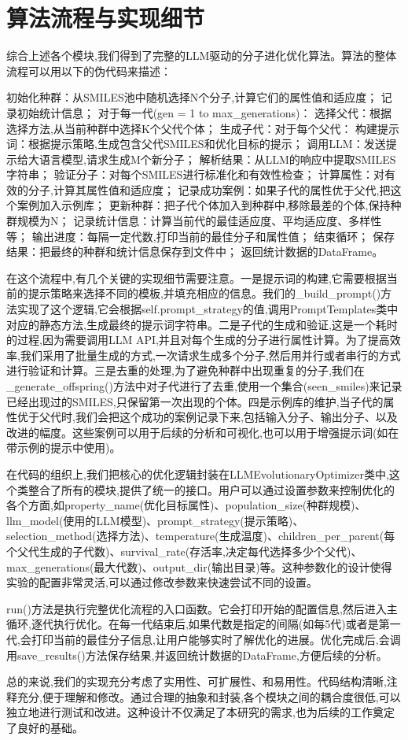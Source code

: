 \section{算法流程与实现细节}

综合上述各个模块,我们得到了完整的LLM驱动的分子进化优化算法。算法的整体流程可以用以下的伪代码来描述：

初始化种群：从SMILES池中随机选择N个分子,计算它们的属性值和适应度；
记录初始统计信息；
对于每一代(gen = 1 to max\_generations)：
  选择父代：根据选择方法,从当前种群中选择K个父代个体；
  生成子代：对于每个父代：
    构建提示词：根据提示策略,生成包含父代SMILES和优化目标的提示；
    调用LLM：发送提示给大语言模型,请求生成M个新分子；
    解析结果：从LLM的响应中提取SMILES字符串；
    验证分子：对每个SMILES进行标准化和有效性检查；
    计算属性：对有效的分子,计算其属性值和适应度；
    记录成功案例：如果子代的属性优于父代,把这个案例加入示例库；
  更新种群：把子代个体加入到种群中,移除最差的个体,保持种群规模为N；
  记录统计信息：计算当前代的最佳适应度、平均适应度、多样性等；
  输出进度：每隔一定代数,打印当前的最佳分子和属性值；
结束循环；
保存结果：把最终的种群和统计信息保存到文件中；
返回统计数据的DataFrame。

在这个流程中,有几个关键的实现细节需要注意。一是提示词的构建,它需要根据当前的提示策略来选择不同的模板,并填充相应的信息。我们的\_build\_prompt()方法实现了这个逻辑,它会根据self.prompt\_strategy的值,调用PromptTemplates类中对应的静态方法,生成最终的提示词字符串。二是子代的生成和验证,这是一个耗时的过程,因为需要调用LLM API,并且对每个生成的分子进行属性计算。为了提高效率,我们采用了批量生成的方式,一次请求生成多个分子,然后用并行或者串行的方式进行验证和计算。三是去重的处理,为了避免种群中出现重复的分子,我们在\_generate\_offspring()方法中对子代进行了去重,使用一个集合(seen\_smiles)来记录已经出现过的SMILES,只保留第一次出现的个体。四是示例库的维护,当子代的属性优于父代时,我们会把这个成功的案例记录下来,包括输入分子、输出分子、以及改进的幅度。这些案例可以用于后续的分析和可视化,也可以用于增强提示词(如在带示例的提示中使用)。

在代码的组织上,我们把核心的优化逻辑封装在LLMEvolutionaryOptimizer类中,这个类整合了所有的模块,提供了统一的接口。用户可以通过设置参数来控制优化的各个方面,如property\_name(优化目标属性)、population\_size(种群规模)、llm\_model(使用的LLM模型)、prompt\_strategy(提示策略)、selection\_method(选择方法)、temperature(生成温度)、children\_per\_parent(每个父代生成的子代数)、survival\_rate(存活率,决定每代选择多少个父代)、max\_generations(最大代数)、output\_dir(输出目录)等。这种参数化的设计使得实验的配置非常灵活,可以通过修改参数来快速尝试不同的设置。

run()方法是执行完整优化流程的入口函数。它会打印开始的配置信息,然后进入主循环,逐代执行优化。在每一代结束后,如果代数是指定的间隔(如每5代)或者是第一代,会打印当前的最佳分子信息,让用户能够实时了解优化的进展。优化完成后,会调用save\_results()方法保存结果,并返回统计数据的DataFrame,方便后续的分析。

总的来说,我们的实现充分考虑了实用性、可扩展性、和易用性。代码结构清晰,注释充分,便于理解和修改。通过合理的抽象和封装,各个模块之间的耦合度很低,可以独立地进行测试和改进。这种设计不仅满足了本研究的需求,也为后续的工作奠定了良好的基础。
